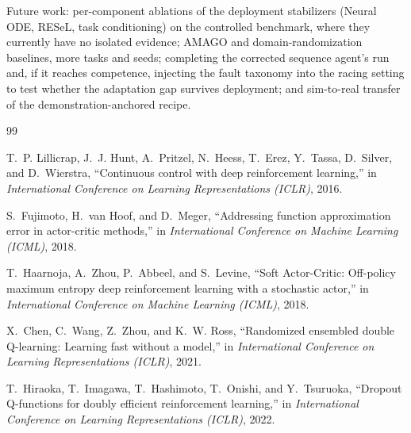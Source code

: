 \documentclass[conference]{IEEEtran}
\begin{document}
Future work: per-component ablations of the deployment stabilizers (Neural ODE, RESeL, task conditioning) on the controlled benchmark, where they currently have no isolated evidence; AMAGO and domain-randomization baselines, more tasks and seeds; completing the corrected sequence agent's run and, if it reaches competence, injecting the fault taxonomy into the racing setting to test whether the adaptation gap survives deployment; and sim-to-real transfer of the demonstration-anchored recipe.



\begingroup


\begin{thebibliography}{99}




T.~P. Lillicrap, J.~J. Hunt, A.~Pritzel, N.~Heess, T.~Erez, Y.~Tassa, D.~Silver, and D.~Wierstra, ``Continuous control with deep reinforcement learning,'' in \emph{International Conference on Learning Representations (ICLR)}, 2016.




S.~Fujimoto, H.~van Hoof, and D.~Meger, ``Addressing function approximation error in actor-critic methods,'' in \emph{International Conference on Machine Learning (ICML)}, 2018.




T.~Haarnoja, A.~Zhou, P.~Abbeel, and S.~Levine, ``Soft Actor-Critic: Off-policy maximum entropy deep reinforcement learning with a stochastic actor,'' in \emph{International Conference on Machine Learning (ICML)}, 2018.




X.~Chen, C.~Wang, Z.~Zhou, and K.~W. Ross, ``Randomized ensembled double Q-learning: Learning fast without a model,'' in \emph{International Conference on Learning Representations (ICLR)}, 2021.




T.~Hiraoka, T.~Imagawa, T.~Hashimoto, T.~Onishi, and Y.~Tsuruoka, ``Dropout Q-functions for doubly efficient reinforcement learning,'' in \emph{International Conference on Learning Representations (ICLR)}, 2022.





\end{thebibliography}
\end{document}
